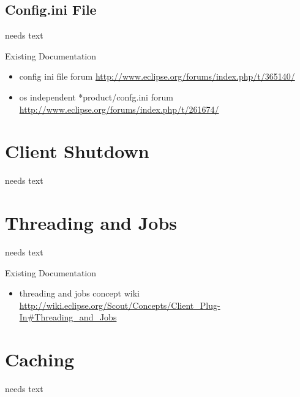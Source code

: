 \documentclass[a4paper,10pt,twoside]{book}
\begin{document}
\subsection{Config.ini File}
needs text

\noindent Existing Documentation
\begin{itemize}
  \item config ini file forum \url{http://www.eclipse.org/forums/index.php/t/365140/}
  \item os independent *product/confg.ini forum \url{http://www.eclipse.org/forums/index.php/t/261674/}
\end{itemize}

\section{Client Shutdown}
needs text

\section{Threading and Jobs}
needs text

\noindent Existing Documentation
\begin{itemize}
  \item threading and jobs concept wiki \url{http://wiki.eclipse.org/Scout/Concepts/Client_Plug-In#Threading_and_Jobs}
\end{itemize}


\section{Caching}
needs text


\ifx\wholebook\relax\else
   
   
\end{document}
